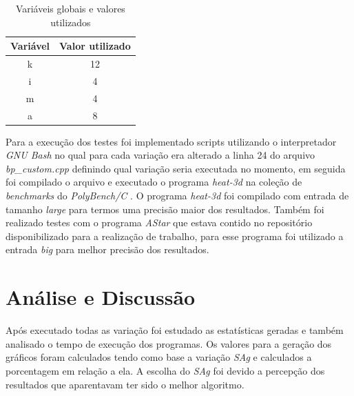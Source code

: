 \documentclass[journal, twoside]{IEEEtran}
\begin{document}
\begin{table}[H]
\centering
\begin{tabular}{|c|c|}
\hline
\textbf{Variável} & \textbf{Valor utilizado} \\ \hline
k                   & 12                       \\ \hline
i                   & 4                        \\ \hline
m                   & 4                        \\ \hline
a                   & 8                        \\ \hline
\end{tabular}
\caption{Variáveis globais e valores utilizados}
\label{tab:params}
\end{table}

Para a execução dos testes foi implementado scripts utilizando o interpretador \textit{GNU Bash} no qual para cada variação era alterado a linha 24 do arquivo \textit{bp\_custom.cpp} definindo qual variação seria executada no momento, em seguida foi compilado o arquivo e executado o programa \textit{heat-3d} na coleção de \textit{benchmarks} do \textit{PolyBench/C} \cite{polybench}. O programa \textit{heat-3d} foi compilado com entrada de tamanho \textit{large} para termos uma precisão maior dos resultados. Também foi realizado testes com o programa \textit{AStar} que estava contido no repositório disponibilizado para a realização de trabalho, para esse programa foi utilizado a entrada \textit{big} para melhor precisão dos resultados.


\section{Análise e Discussão} \label{analise}
Após executado todas as variação foi estudado as estatísticas geradas e também analisado o tempo de execução dos programas. Os valores para a geração dos gráficos foram calculados tendo como base a variação \textit{SAg} e calculados a porcentagem em relação a ela. A escolha do \textit{SAg} foi devido a percepção dos resultados que aparentavam ter sido o melhor algoritmo. 
\end{document}

